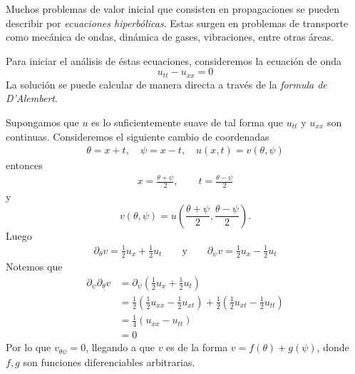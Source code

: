 Muchos problemas de valor inicial que consisten en propagaciones se pueden describir por \textit{ecuaciones hiperbólicas}. Estas surgen en problemas de transporte como mecánica de ondas, dinámica de gases, vibraciones, entre otras áreas.

Para iniciar el análisis de éstas ecuaciones, consideremos la ecuación de onda
\[
u_{tt} - u_{xx} = 0
\]
La solución se puede calcular de manera directa a través de la \textit{formula de D'Alembert}.

Supongamos que $u$ es lo suficientemente suave de tal forma que $u_{tt}$ y $u_{xx}$ son continuas. Consideremos el siguiente cambio de coordenadas
\begin{align*}
\theta = x + t, \quad \psi = x-t, \quad u(x,t)=v(\theta, \psi)
\end{align*}
entonces
\begin{align*}
x = \frac{\theta + \psi}{2}, \qquad t = \frac{\theta - \psi}{2}
\end{align*}
y
\[
v(\theta, \psi) = u \left( \frac{\theta + \psi}{2}, \frac{\theta - \psi}{2} \right).
\]
Luego
\begin{align*}
\partial_{\theta} v = \frac{1}{2} u_x + \frac{1}{2} u_t \qquad \text{y} \qquad \partial _{\psi} v = \frac{1}{2} u_x - \frac{1}{2} u_t
\end{align*}
Notemos que
\begin{align*}
\partial_{\psi} \partial_{\theta} v &= \partial_{\psi} \left( \frac{1}{2} u_x + \frac{1}{2} u_t \right) \\
&= \frac{1}{2} \left( \frac{1}{2} u_{xx} - \frac{1}{2} u_{xt} \right) + \frac{1}{2} \left( \frac{1}{2} u_{xt} - \frac{1}{2} u_{tt} \right) \\
&= \frac{1}{4} \left( u_{xx} - u_{tt} \right) \\
&= 0
\end{align*}
Por lo que $v_{\theta \psi} = 0$, llegando a que $v$ es de la forma $v = f(\theta) + g(\psi)$, donde $f,g$ son funciones diferenciables arbitrarias.

